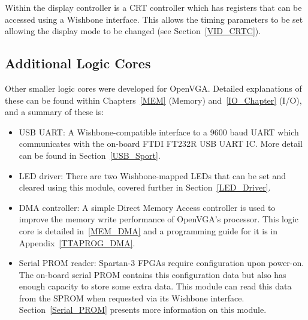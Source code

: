 Within the display controller is a CRT controller which has registers that can be
accessed using a Wishbone interface. This allows the timing parameters to be set
allowing the display mode to be changed (see Section~\ref{VID_CRTC}).


\subsection{Additional Logic Cores}
Other smaller logic cores were developed for OpenVGA. Detailed explanations of
these can be found within Chapters~\ref{MEM} (Memory) and~\ref{IO_Chapter}
(I/O), and a summary of these is:

\begin{itemize}
  \item USB UART: A Wishbone-compatible interface to a 9600 baud UART which
  communicates with the on-board FTDI FT232R USB UART IC. More detail can be
  found in Section~\ref{USB_Sport}.
  \item LED driver: There are two Wishbone-mapped LEDs that can be set and
  cleared using this module, covered further in Section~\ref{LED_Driver}.
  \item DMA controller: A simple Direct Memory Access controller is used to
  improve the memory write performance of OpenVGA's processor. This logic core
  is detailed in~\ref{MEM_DMA} and a programming guide for it is in
  Appendix~\ref{TTAPROG_DMA}.
  \item Serial PROM reader: Spartan-3 FPGAs require configuration upon
  power-on. The on-board serial PROM contains this configuration data but also
  has enough capacity to store some extra data. This module can read this data
  from the SPROM when requested via its Wishbone interface.
  Section~\ref{Serial_PROM} presents more information on this module.
\end{itemize}
